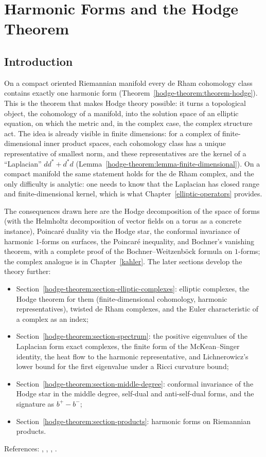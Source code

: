 \chapter{Harmonic Forms and the Hodge Theorem}\label{hodge-theorem}

\section{Introduction}\label{hodge-theorem:section-introduction}

On a compact oriented Riemannian manifold every de Rham cohomology class contains exactly one harmonic form
(Theorem~\ref{hodge-theorem:theorem-hodge}). This is the theorem that makes Hodge theory possible: it turns a topological object,
the cohomology of a manifold, into the solution space of an elliptic equation, on which the metric and, in the complex case, the
complex structure act. The idea is already visible in finite dimensions: for a complex of finite-dimensional inner product spaces, each cohomology class has a unique representative of
smallest norm, and these representatives are the kernel of a ``Laplacian'' $dd^* + d^*d$ (Lemma~\ref{hodge-theorem:lemma-finite-dimensional}). On a compact manifold the same statement holds for
the de Rham complex, and the only difficulty is analytic: one needs to know that the Laplacian has closed range and finite-dimensional kernel, which is what
Chapter~\ref{elliptic-operators} provides.

The consequences drawn here are the Hodge decomposition of the space of forms (with the Helmholtz decomposition of vector fields on a torus as a concrete instance), Poincar\'e duality via the
Hodge star, the conformal invariance of harmonic $1$-forms on surfaces, the Poincar\'e inequality, and Bochner's vanishing theorem, with a complete proof of the Bochner--Weitzenb\"ock formula on
$1$-forms; the complex analogue is in Chapter~\ref{kahler}. The later sections develop the theory further:
\begin{itemize}
\item Section~\ref{hodge-theorem:section-elliptic-complexes}: elliptic complexes, the Hodge theorem for them (finite-dimensional cohomology, harmonic representatives), twisted de Rham complexes, and the Euler
characteristic of a complex as an index;
\item Section~\ref{hodge-theorem:section-spectrum}: the positive eigenvalues of the Laplacian form exact complexes, the finite form of the McKean--Singer identity, the heat flow to the harmonic representative,
and Lichnerowicz's lower bound for the first eigenvalue under a Ricci curvature bound;
\item Section~\ref{hodge-theorem:section-middle-degree}: conformal invariance of the Hodge star in the middle degree, self-dual and anti-self-dual forms, and the signature as $b^+ - b^-$;
\item Section~\ref{hodge-theorem:section-products}: harmonic forms on Riemannian products.
\end{itemize} References: \cite[Chapter 6]{warner-foundations}, \cite[Chapter 4]{wells-differential-analysis},
\cite[Chapter 0]{griffiths-harris}, \cite[Chapter 5]{voisin-hodge-1}.

